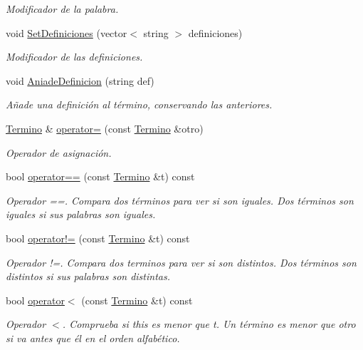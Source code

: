 \begin{DoxyCompactItemize}
\begin{DoxyCompactList}\small\item\em Modificador de la palabra. \end{DoxyCompactList}\item 
void \hyperlink{classTermino_a2345118df3073c53c0722abb4b091da0}{Set\+Definiciones} (vector$<$ string $>$ definiciones)
\begin{DoxyCompactList}\small\item\em Modificador de las definiciones. \end{DoxyCompactList}\item 
void \hyperlink{classTermino_a93fed012290bc28881288cfd095c8500}{Aniade\+Definicion} (string def)
\begin{DoxyCompactList}\small\item\em Añade una definición al término, conservando las anteriores. \end{DoxyCompactList}\item 
\hyperlink{classTermino}{Termino} \& \hyperlink{classTermino_a57e30838c746677128101bae99df1366}{operator=} (const \hyperlink{classTermino}{Termino} \&otro)
\begin{DoxyCompactList}\small\item\em Operador de asignación. \end{DoxyCompactList}\item 
bool \hyperlink{classTermino_adf075fbce1b208a5214e9364e5f2520a}{operator==} (const \hyperlink{classTermino}{Termino} \&t) const
\begin{DoxyCompactList}\small\item\em Operador ==. Compara dos términos para ver si son iguales. Dos términos son iguales si sus palabras son iguales. \end{DoxyCompactList}\item 
bool \hyperlink{classTermino_a18fcc1cd64321afc8e17bb7ddaa9172a}{operator!=} (const \hyperlink{classTermino}{Termino} \&t) const
\begin{DoxyCompactList}\small\item\em Operador !=. Compara dos terminos para ver si son distintos. Dos términos son distintos si sus palabras son distintas. \end{DoxyCompactList}\item 
bool \hyperlink{classTermino_a2674fda8a9f8f9e40ba338953e3e94ae}{operator$<$} (const \hyperlink{classTermino}{Termino} \&t) const
\begin{DoxyCompactList}\small\item\em Operador $<$. Comprueba si this es menor que t. Un término es menor que otro si va antes que él en el orden alfabético. \end{DoxyCompactList}\item 

\end{DoxyCompactItemize}
